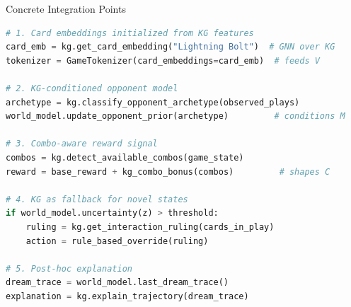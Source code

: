 \documentclass[aspectratio=169, 11pt]{beamer}
\begin{document}
\begin{frame}[fragile]{Concrete Integration Points}
  \begin{lstlisting}[language=Python]
# 1. Card embeddings initialized from KG features
card_emb = kg.get_card_embedding("Lightning Bolt")  # GNN over KG
tokenizer = GameTokenizer(card_embeddings=card_emb)  # feeds V

# 2. KG-conditioned opponent model
archetype = kg.classify_opponent_archetype(observed_plays)
world_model.update_opponent_prior(archetype)         # conditions M

# 3. Combo-aware reward signal
combos = kg.detect_available_combos(game_state)
reward = base_reward + kg_combo_bonus(combos)         # shapes C

# 4. KG as fallback for novel states
if world_model.uncertainty(z) > threshold:
    ruling = kg.get_interaction_ruling(cards_in_play)
    action = rule_based_override(ruling)

# 5. Post-hoc explanation
dream_trace = world_model.last_dream_trace()
explanation = kg.explain_trajectory(dream_trace)
  \end{lstlisting}
\end{frame}
\end{document}
